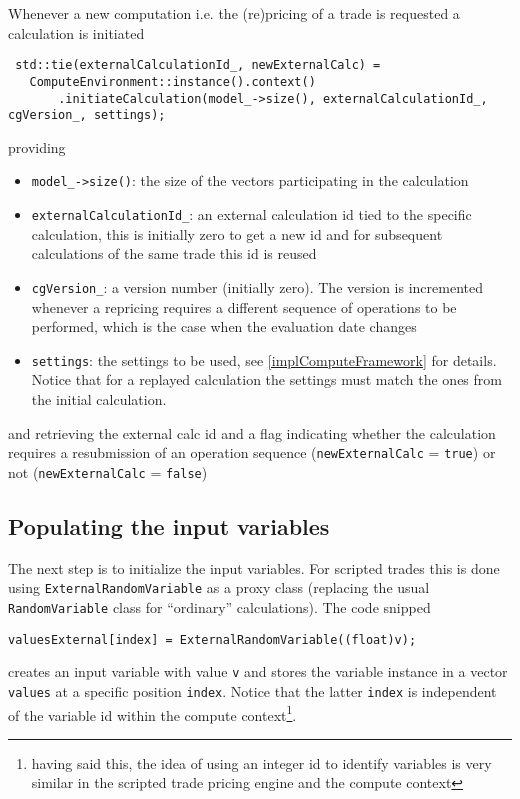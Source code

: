 \documentclass[12pt, a4paper]{article}
\begin{document}
Whenever a new computation i.e. the (re)pricing of a trade is requested a calculation is initiated

\begin{verbatim}
 std::tie(externalCalculationId_, newExternalCalc) =
   ComputeEnvironment::instance().context()
       .initiateCalculation(model_->size(), externalCalculationId_, cgVersion_, settings);
\end{verbatim}

providing

\begin{itemize}
\item \verb+model_->size()+: the size of the vectors participating in the calculation
\item \verb+externalCalculationId_+: an external calculation id tied to the specific calculation, this is initially zero
  to get a new id and for subsequent calculations of the same trade this id is reused
\item \verb+cgVersion_+: a version number (initially zero). The version is incremented whenever a repricing requires a
  different sequence of operations to be performed, which is the case when the evaluation date changes
\item \verb+settings+: the settings to be used, see \ref{implComputeFramework} for details. Notice that for a replayed
  calculation the settings must match the ones from the initial calculation.
\end{itemize}

and retrieving the external calc id and a flag indicating whether the calculation requires a resubmission of an
operation sequence (\verb+newExternalCalc+ = \verb+true+) or not (\verb+newExternalCalc+ = \verb+false+)

\subsection{Populating the input variables}

The next step is to initialize the input variables. For scripted trades this is done using \verb+ExternalRandomVariable+
as a proxy class (replacing the usual \verb+RandomVariable+ class for ``ordinary'' calculations). The code snipped

\begin{verbatim}
valuesExternal[index] = ExternalRandomVariable((float)v);
\end{verbatim}

creates an input variable with value \verb+v+ and stores the variable instance in a vector \verb+values+ at a specific
position \verb+index+. Notice that the latter \verb+index+ is independent of the variable id within the compute
context\footnote{having said this, the idea of using an integer id to identify variables is very similar in the scripted
trade pricing engine and the compute context}.
\end{document}
